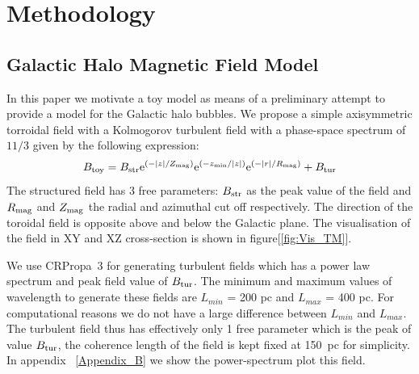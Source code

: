 \documentclass[12pt, a4 paper]{article}
\begin{document}

\section{Methodology}
\label{method}

\subsection{Galactic Halo Magnetic Field Model}
\label{GMF}
In this paper we motivate a toy model as means of a preliminary attempt to provide a model for the Galactic halo bubbles. We propose a simple axisymmetric torroidal field with a Kolmogorov turbulent field with a phase-space spectrum of $11/3$ given by the following expression:
\begin{equation}\label{TM_equation}
        B_{\mathrm{toy}}= B_{\rm{str}}\mathrm{e}^{{(-\abs{{z}}/Z_{{\mathrm{mag}}})}} \mathrm{e}^{{(-z_{{\mathrm{min}}}/\abs{{z}})}}\mathrm{e}^{{(-\abs{{r}}/R_{{\mathrm{mag}}})}} + B_{\rm{tur}}
\end{equation}
The structured field has 3 free parameters: $B_{\rm str}$ as the peak value of the field and $R_{\rm {mag}}$ and $Z_{\rm {mag}}$ the radial and azimuthal cut off respectively. The direction of the toroidal field is opposite above and below the Galactic plane. The visualisation of the field in XY and XZ cross-section is shown in
figure[\ref{fig:Vis_TM}]. 

We use CRPropa~3 \cite{CRPropa3_2016} for generating turbulent fields which has a power law spectrum and peak field value of $B_{\rm{tur}}$. 
The minimum and maximum values of wavelength to generate these fields are  $L_{min}$ = 200 pc and $L_{max}$ = 400 pc. For computational reasons we do not have a large difference between  $L_{min}$ and $L_{max}$.
The turbulent field thus has effectively only 1 free parameter which is the peak of value $ B_{\rm{tur}}$, the coherence length of the field is kept fixed at 150~pc for simplicity.  In appendix ~\ref{Appendix_B} we show the power-spectrum plot this field.
\end{document}
